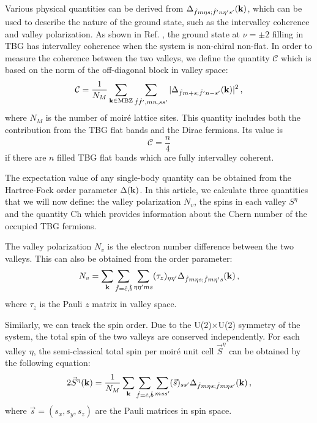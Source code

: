 \documentclass[prb,aps,nofootinbib,amssymb,twocolumn,superscriptaddress,10pt]{revtex4-2}
\begin{document}
Various physical quantities can be derived from $\Delta_{\hat{f}m\eta s;\hat{f}'n\eta' s'}(\mathbf{k})$, which can be used to describe the nature of the ground state, such as the intervalley coherence and valley polarization. As shown in Ref. \cite{LIA20}, the ground state at $\nu=\pm2$ filling in TBG has intervalley coherence when the system is non-chiral non-flat. In order to measure the coherence between the two valleys, we define the quantity $\mathcal{C}$ which is based on the norm of the off-diagonal block in valley space:
\begin{equation}\label{eqn:def_vc}
	\mathcal{C} = \frac{1}{N_M}\sum_{\mathbf{k}\in{\rm MBZ}}\sum_{\hat{f}\hat{f}',mn,ss'}|\Delta_{\hat{f}m+s;\hat{f}'n-s'}(\mathbf{k})|^2 \,,
\end{equation}
where $N_M$ is the number of moir\'e lattice sites. This quantity includes both the contribution from the TBG flat bands and the Dirac fermions. Its value is 
\begin{equation}
    \mathcal{C} = \frac{n}{4}
\end{equation} if there are $n$ filled TBG flat bands which are fully intervalley coherent. 

The expectation value of any single-body quantity can be obtained from the Hartree-Fock order parameter $\Delta(\mathbf{k})$. 
In this article, we calculate three quantities that we will now define: the valley polarization $N_v$, the spins in each valley $S^\eta$ and the quantity $\mathrm{Ch}$ which provides information about the Chern number of the occupied TBG fermions.

The valley polarization $N_v$ is the electron number difference between the two valleys. This can also be obtained from the order parameter:
\begin{equation}\label{eqn:def_Nv}
	N_v = \sum_{\mathbf{k}}\sum_{\hat{f}=\hat{c},\hat{b}}\sum_{\eta\eta' m s}(\tau_z)_{\eta\eta'}\Delta_{\hat{f}m\eta s; \hat{f}m \eta' s}(\mathbf{k})\,,
\end{equation}
where $\tau_z$ is the Pauli $z$ matrix in valley space.

Similarly, we can track the spin order. Due to the U(2)$\times$U(2) symmetry of the system, the total spin of the two valleys are conserved independently. For each valley $\eta$, the semi-classical total spin per moir\'e unit cell $\vec{S}^\eta$ can be obtained by the following equation:
\begin{equation}\label{eqn:def_Spm}
	2\vec{S}^\eta(\mathbf{k}) = \frac{1}{N_M}\sum_{\mathbf{k}}\sum_{\hat{f}=\hat{c},\hat{b}}\sum_{mss'}(\vec{s})_{ss'}\Delta_{\hat{f}m\eta s; \hat{f}m\eta s'}(\mathbf{k})\,,
\end{equation}
where $\vec{s}=(s_x, s_y, s_z)$ are the Pauli matrices in spin space. 
\end{document}

